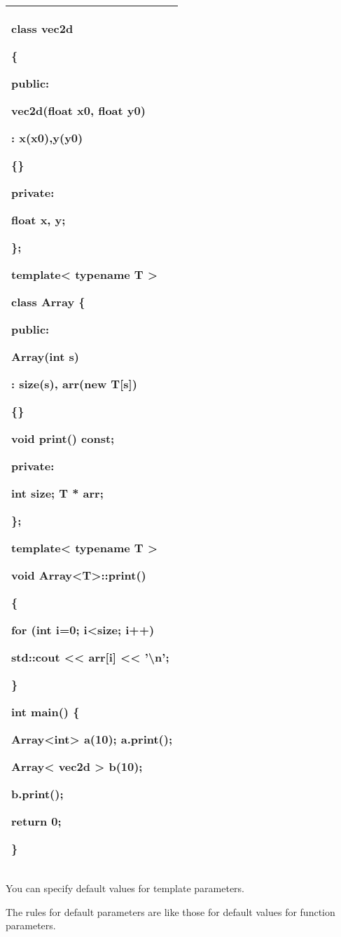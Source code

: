 \documentclass[
]{article}
\begin{document}
\begin{longtable}[]{@{}l@{}}
\toprule
\endhead
\begin{minipage}[t]{0.97\columnwidth}\raggedright
class vec2d

\{

public:

vec2d(float x0, float y0)

: x(x0),y(y0)

\{\}

private:

float x, y;

\};

template\textless{} typename T \textgreater{}

class Array \{

public:

Array(int s)

: size(s), arr(new T{[}s{]})

\{\}

void print() const;

private:

int size; T * arr;

\};

template\textless{} typename T \textgreater{}

void Array\textless T\textgreater::print()

\{

for (int i=0; i\textless size; i++)

std::cout \textless\textless{} arr{[}i{]} \textless\textless{}
'\textbackslash n';

\}

int main() \{

Array\textless int\textgreater{} a(10); a.print();

\textbf{ Array\textless{} vec2d \textgreater{} b(10); }

b.print();

return 0;

\}\strut
\end{minipage}\tabularnewline
\bottomrule
\end{longtable}

You can specify default values for template parameters.

The rules for default parameters are like those for default values for
function parameters.
\end{document}
